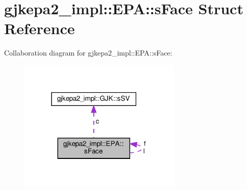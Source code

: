 \hypertarget{structgjkepa2__impl_1_1EPA_1_1sFace}{}\section{gjkepa2\+\_\+impl\+:\+:E\+PA\+:\+:s\+Face Struct Reference}
\label{structgjkepa2__impl_1_1EPA_1_1sFace}


Collaboration diagram for gjkepa2\+\_\+impl\+:\+:E\+PA\+:\+:s\+Face\+:
\nopagebreak
\begin{figure}[H]
\begin{center}
\leavevmode
\includegraphics[width=220pt]{structgjkepa2__impl_1_1EPA_1_1sFace__coll__graph}
\end{center}
\end{figure}
